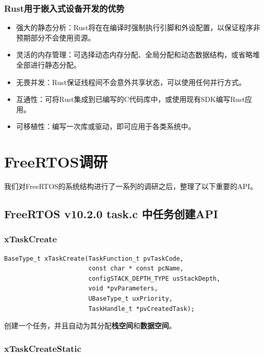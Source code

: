 \documentclass[12pt, a4paper]{article}
\begin{document}
	\subsubsection{Rust用于嵌入式设备开发的优势}
	\begin{itemize}
		\item 强大的静态分析：Rust将在在编译时强制执行引脚和外设配置，以保证程序非预期部分不会使用资源。   
		\item 灵活的内存管理：可选择动态内存分配、全局分配和动态数据结构，或省略堆全部进行静态分配。
		\item 无畏并发：Rust保证线程间不会意外共享状态，可以使用任何并行方式。   
		\item 互通性：可将Rust集成到已编写的C代码库中，或使用现有SDK编写Rust应用。
		\item 可移植性：编写一次库或驱动，即可应用于各类系统中。
	\end{itemize}
	
	\section{FreeRTOS调研}
	我们对FreeRTOS的系统结构进行了一系列的调研之后，整理了以下重要的API。
	\subsection{FreeRTOS v10.2.0 task.c 中任务创建API}
	\subsubsection {xTaskCreate}

	\begin{lstlisting}[language={[ANSI]C},keywordstyle=\color{blue!70},commentstyle=\color{red!50!green!50!blue!50},frame=shadowbox, rulesepcolor=\color{red!20!green!20!blue!20}]
BaseType_t xTaskCreate(TaskFunction_t pvTaskCode,
                       const char * const pcName,
                       configSTACK_DEPTH_TYPE usStackDepth,
                       void *pvParameters,
                       UBaseType_t uxPriority,
                       TaskHandle_t *pvCreatedTask);
\end{lstlisting}

创建一个任务，并且自动为其分配\textbf{栈空间}和\textbf{数据空间}。

\subsubsection {xTaskCreateStatic}
\end{document}
